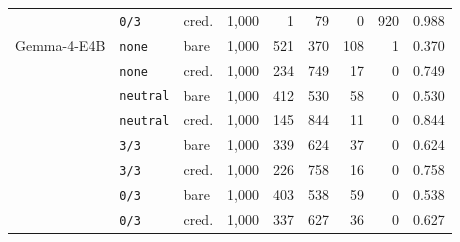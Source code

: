 \begin{tabular}{lllrrrrrr}
 & \texttt{0/3} & cred. & 1,000 & 1 & 79 & 0 & 920 & 0.988 \\
Gemma-4-E4B & \texttt{none} & bare & 1,000 & 521 & 370 & 108 & 1 & 0.370 \\
 & \texttt{none} & cred. & 1,000 & 234 & 749 & 17 & 0 & 0.749 \\
 & \texttt{neutral} & bare & 1,000 & 412 & 530 & 58 & 0 & 0.530 \\
 & \texttt{neutral} & cred. & 1,000 & 145 & 844 & 11 & 0 & 0.844 \\
 & \texttt{3/3} & bare & 1,000 & 339 & 624 & 37 & 0 & 0.624 \\
 & \texttt{3/3} & cred. & 1,000 & 226 & 758 & 16 & 0 & 0.758 \\
 & \texttt{0/3} & bare & 1,000 & 403 & 538 & 59 & 0 & 0.538 \\
 & \texttt{0/3} & cred. & 1,000 & 337 & 627 & 36 & 0 & 0.627 \\
\bottomrule
\end{tabular}
